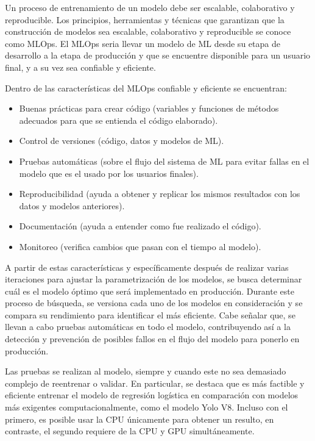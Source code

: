 Un proceso de entrenamiento de un modelo debe ser escalable, colaborativo y reproducible. Los principios, herramientas y técnicas que garantizan que la construcción de modelos sea escalable, colaborativo y reproducible se conoce como MLOps. El MLOps seria llevar un modelo de ML desde su etapa de desarrollo a la etapa de producción y que se encuentre disponible para un usuario final, y a su vez sea confiable y eficiente.

Dentro de las características del MLOps confiable y eficiente se encuentran:

\begin{itemize}
    \item Buenas prácticas para crear código (variables y funciones de métodos adecuados para que se entienda el código elaborado).
    \item Control de versiones (código, datos y modelos de ML).
    \item Pruebas automáticas (sobre el flujo del sistema de ML para evitar fallas en el modelo que es el usado por los usuarios finales).
    \item Reproducibilidad (ayuda a obtener y replicar los mismos resultados con los datos y modelos anteriores).
    \item Documentación (ayuda a entender como fue realizado el código).
    \item Monitoreo (verifica cambios que pasan con el tiempo al modelo).
\end{itemize}

A partir de estas características y específicamente después de realizar varias iteraciones para ajustar la parametrización de los modelos, se busca determinar cuál es el modelo óptimo que será implementado en producción. Durante este proceso de búsqueda, se versiona cada uno de los modelos en consideración y se compara su rendimiento para identificar el más eficiente. Cabe señalar que, se llevan a cabo pruebas automáticas en todo el modelo, contribuyendo así a la detección y prevención de posibles fallos en el flujo del modelo para ponerlo en producción. \newline

Las pruebas se realizan al modelo, siempre y cuando este no sea demasiado complejo de reentrenar o validar. En particular, se destaca que es más factible y eficiente entrenar el modelo de regresión logística en comparación con modelos más exigentes computacionalmente, como el modelo Yolo V8. Incluso con el primero, es posible usar la CPU únicamente para obtener un resulto, en contraste, el segundo requiere de la CPU y GPU simultáneamente. \newline

